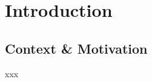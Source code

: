 \chapter{Introduction}
\label{chapter:introduction}
\localtableofcontents


\section{Context \& Motivation}

xxx
